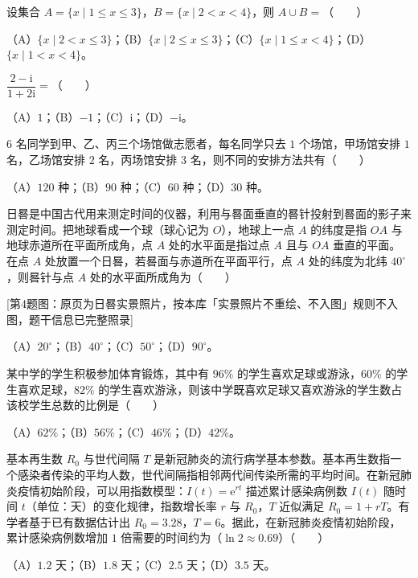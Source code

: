 \begin{question}
设集合 $A=\{x\mid 1\leqslant x\leqslant 3\}$，$B=\{x\mid 2<x<4\}$，则 $A\cup B=$\mbox{（　　）}

（A）$\{x\mid 2<x\leqslant 3\}$；（B）$\{x\mid 2\leqslant x\leqslant 3\}$；（C）$\{x\mid 1\leqslant x<4\}$；（D）$\{x\mid 1<x<4\}$。

\end{question}
\begin{question}
$\dfrac{2-\mathrm i}{1+2\mathrm i}=$\mbox{（　　）}

（A）$1$；（B）$-1$；（C）$\mathrm i$；（D）$-\mathrm i$。

\end{question}
\begin{question}
$6$ 名同学到甲、乙、丙三个场馆做志愿者，每名同学只去 $1$ 个场馆，甲场馆安排 $1$ 名，乙场馆安排 $2$ 名，丙场馆安排 $3$ 名，则不同的安排方法共有\mbox{（　　）}

（A）$120$ 种；（B）$90$ 种；（C）$60$ 种；（D）$30$ 种。

\end{question}
\begin{question}
日晷是中国古代用来测定时间的仪器，利用与晷面垂直的晷针投射到晷面的影子来测定时间。把地球看成一个球（球心记为 $O$），地球上一点 $A$ 的纬度是指 $OA$ 与地球赤道所在平面所成角，点 $A$ 处的水平面是指过点 $A$ 且与 $OA$ 垂直的平面。在点 $A$ 处放置一个日晷，若晷面与赤道所在平面平行，点 $A$ 处的纬度为北纬 $40^\circ$，则晷针与点 $A$ 处的水平面所成角为\mbox{（　　）}

[第4题图：原页为日晷实景照片，按本库「实景照片不重绘、不入图」规则不入图，题干信息已完整照录]

（A）$20^\circ$；（B）$40^\circ$；（C）$50^\circ$；（D）$90^\circ$。

\end{question}
\begin{question}
某中学的学生积极参加体育锻炼，其中有 $96\%$ 的学生喜欢足球或游泳，$60\%$ 的学生喜欢足球，$82\%$ 的学生喜欢游泳，则该中学既喜欢足球又喜欢游泳的学生数占该校学生总数的比例是\mbox{（　　）}

（A）$62\%$；（B）$56\%$；（C）$46\%$；（D）$42\%$。

\end{question}
\begin{question}
基本再生数 $R_0$ 与世代间隔 $T$ 是新冠肺炎的流行病学基本参数。基本再生数指一个感染者传染的平均人数，世代间隔指相邻两代间传染所需的平均时间。在新冠肺炎疫情初始阶段，可以用指数模型：$I(t)=\mathrm e^{rt}$ 描述累计感染病例数 $I(t)$ 随时间 $t$（单位：天）的变化规律，指数增长率 $r$ 与 $R_0$，$T$ 近似满足 $R_0=1+rT$。有学者基于已有数据估计出 $R_0=3.28$，$T=6$。据此，在新冠肺炎疫情初始阶段，累计感染病例数增加 $1$ 倍需要的时间约为（$\ln2\approx0.69$）\mbox{（　　）}

（A）$1.2$ 天；（B）$1.8$ 天；（C）$2.5$ 天；（D）$3.5$ 天。

\end{question}
